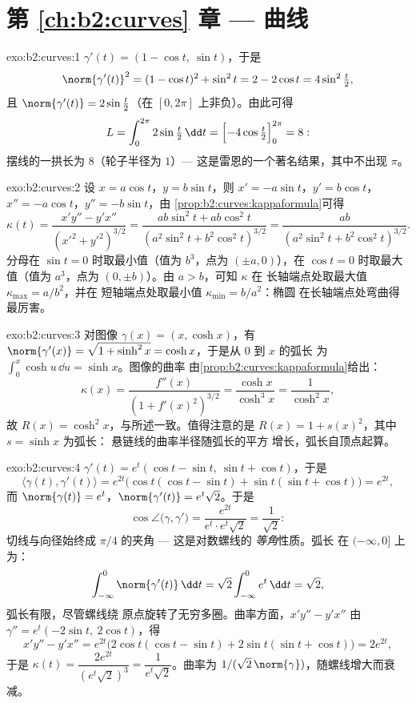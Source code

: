 \section*{第 \ref{ch:b2:curves} 章 --- 曲线}

\begin{solution}{exo:b2:curves:1}
$\gamma'(t) = (1 - \cos t,\ \sin t)$，于是
\[
\norm{\gamma'(t)}^2 = (1 - \cos t)^2 + \sin^2 t
= 2 - 2\cos t = 4\sin^2\tfrac t2 ,
\]
且 $\norm{\gamma'(t)} = 2\sin\frac t2$（在 $[0,
2\pi]$ 上非负）。由此可得
\[
L = \int_0^{2\pi} 2\sin\tfrac t2\,\dd t
= \Bigl[-4\cos\tfrac t2\Bigr]_0^{2\pi} = 8 :
\]
摆线的一拱长为 $8$（轮子半径为
$1$）--- 这是雷恩的一个著名结果，其中不出现 $\pi$。
\end{solution}

\begin{solution}{exo:b2:curves:2}
设 $x = a\cos t$，$y = b\sin t$，则 $x' = -a\sin t$，$y' = b\cos
t$，$x'' = -a\cos t$，$y'' = -b\sin t$，由
\cref{prop:b2:curves:kappaformula}可得
\[
\kappa(t)
= \frac{x'y'' - y'x''}{(x'^2 + y'^2)^{3/2}}
= \frac{ab\sin^2 t + ab\cos^2 t}
       {(a^2\sin^2 t + b^2\cos^2 t)^{3/2}}
= \frac{ab}{(a^2\sin^2 t + b^2\cos^2 t)^{3/2}} .
\]
分母在 $\sin t = 0$ 时取最小值（值为 $b^3$，点为
$(\pm a, 0)$），在 $\cos t = 0$ 时取最大值（值为 $a^3$，点为
$(0, \pm b)$）。由 $a > b$，可知 $\kappa$ 在
长轴端点处取最大值 $\kappa_{\max} = a/b^2$，并在
短轴端点处取最小值 $\kappa_{\min} = b/a^2$：椭圆
在长轴端点处弯曲得最厉害。
\end{solution}

\begin{solution}{exo:b2:curves:3}
对图像 $\gamma(x) = (x, \cosh x)$，有 $\norm{\gamma'(x)} =
\sqrt{1 + \sinh^2 x} = \cosh x$，于是从 $0$ 到 $x$ 的弧长
为 $\int_0^x \cosh u\,\dd u = \sinh x$。图像的曲率
由\cref{prop:b2:curves:kappaformula}给出：
\[
\kappa(x) = \frac{f''(x)}{(1 + f'(x)^2)^{3/2}}
= \frac{\cosh x}{\cosh^3 x} = \frac{1}{\cosh^2 x} ,
\]
故 $R(x) = \cosh^2 x$，与所述一致。值得注意的是
$R(x) = 1 + s(x)^2$，其中 $s = \sinh x$ 为弧长：
悬链线的曲率半径随弧长的平方
增长，弧长自顶点起算。
\end{solution}

\begin{solution}{exo:b2:curves:4}
$\gamma'(t) = e^t(\cos t - \sin t,\ \sin t + \cos t)$，于是
\[
\langle \gamma(t), \gamma'(t)\rangle = e^{2t}
\bigl(\cos t(\cos t - \sin t) + \sin t(\sin t + \cos t)\bigr)
= e^{2t},
\]
而 $\norm{\gamma(t)} = e^t$，$\norm{\gamma'(t)} =
e^t\sqrt 2$。于是
\[
\cos\angle\bigl(\gamma, \gamma'\bigr)
= \frac{e^{2t}}{e^t \cdot e^t\sqrt2} = \frac{1}{\sqrt2} :
\]
切线与向径始终成 $\pi/4$ 的夹角 --- 这是对数螺线的
\emph{等角}性质。弧长
在 $(-\infty, 0]$ 上为：
\[
\int_{-\infty}^0 \norm{\gamma'(t)}\,\dd t
= \sqrt2\int_{-\infty}^0 e^t\,\dd t = \sqrt 2 ,
\]
弧长有限，尽管螺线绕
原点旋转了无穷多圈。曲率方面，$x'y'' - y'x''$ 由 $\gamma'' =
e^t(-2\sin t,\ 2\cos t)$，得
\[
x'y'' - y'x'' = e^{2t}\bigl(2\cos t(\cos t - \sin t)
+ 2\sin t(\sin t + \cos t)\bigr) = 2e^{2t},
\]
于是 $\kappa(t) = \dfrac{2e^{2t}}{(e^t\sqrt2)^3} =
\dfrac{1}{e^t\sqrt2}$。曲率为 $1/(\sqrt2\,
\norm{\gamma})$，随螺线增大而衰减。
\end{solution}

